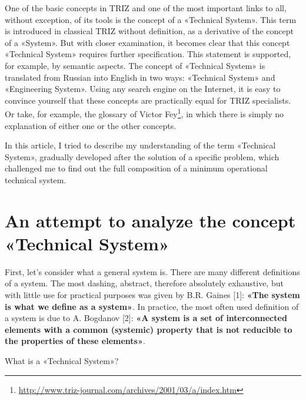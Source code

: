 \documentclass[11pt,a4paper]{article}
\begin{document}
One of the basic concepts in TRIZ and one of the most important links to all,
without exception, of its tools is the concept of a «Technical System». This
term is introduced in classical TRIZ without definition, as a derivative of
the concept of a «System». But with closer examination, it becomes clear that
this concept «Technical System» requires further specification. This statement
is supported, for example, by semantic aspects.  The concept of «Technical
System» is translated from Russian into English in two ways: «Technical
System» and «Engineering System». Using any search engine on the Internet, it
is easy to convince yourself that these concepts are practically equal for
TRIZ specialists. Or take, for example, the glossary of Victor
Fey\footnote{\url{http://www.triz-journal.com/archives/2001/03/a/index.htm}},
in which there is simply no explanation of either one or the other concepts.

In this article, I tried to describe my understanding of the term «Technical
System», gradually developed after the solution of a specific problem, which
challenged me to find out the full composition of a minimum operational
technical system.

\section*{An attempt to analyze the concept «Technical System»}

First, let's consider what a general system is. There are many different
definitions of a system. The most dashing, abstract, therefore absolutely
exhaustive, but with little use for practical purposes was given by
B.R. Gaines [1]: \textbf{«The system is what we define as a system»}. In
practice, the most often used definition of a system is due to A. Bogdanov
[2]: \textbf{«A system is a set of interconnected elements with a common
  (systemic) property that is not reducible to the properties of these
  elements»}.

What is a «Technical System»?
\end{document}
